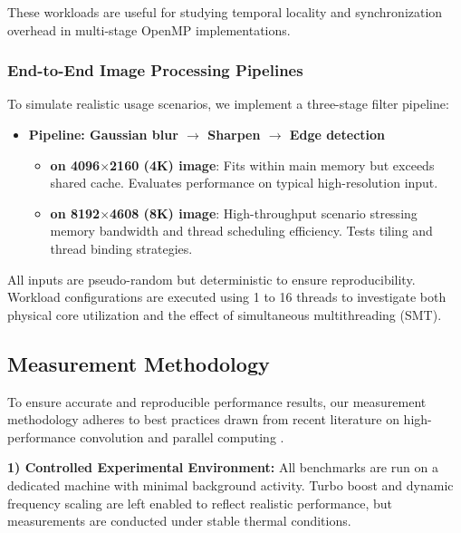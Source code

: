 \documentclass[conference, 10pt]{IEEEtran}
\begin{document}
These workloads are useful for studying temporal locality and synchronization overhead in multi-stage OpenMP implementations.

\subsubsection{End-to-End Image Processing Pipelines}

To simulate realistic usage scenarios, we implement a three-stage filter pipeline:

\begin{itemize}
    \item \textbf{Pipeline: Gaussian blur $\rightarrow$ Sharpen $\rightarrow$ Edge detection}
    \begin{itemize}
        \item \textbf{on 4096$\times$2160 (4K) image}: Fits within main memory but exceeds shared cache. Evaluates performance on typical high-resolution input.
        \item \textbf{on 8192$\times$4608 (8K) image}: High-throughput scenario stressing memory bandwidth and thread scheduling efficiency. Tests tiling and thread binding strategies.
    \end{itemize}
\end{itemize}

All inputs are pseudo-random but deterministic to ensure reproducibility. Workload configurations are executed using 1 to 16 threads to investigate both physical core utilization and the effect of simultaneous multithreading (SMT).


\subsection{Measurement Methodology}

To ensure accurate and reproducible performance results, our measurement methodology adheres to best practices drawn from recent literature on high-performance convolution and parallel computing \cite{williams2009roofline, bhattacharjee2020analyzing, imran2022openmp, chen2021benchmarking}.

\vspace{0.5em}
\textbf{1) Controlled Experimental Environment:} All benchmarks are run on a dedicated machine with minimal background activity. Turbo boost and dynamic frequency scaling are left enabled to reflect realistic performance, but measurements are conducted under stable thermal conditions.
\end{document}
